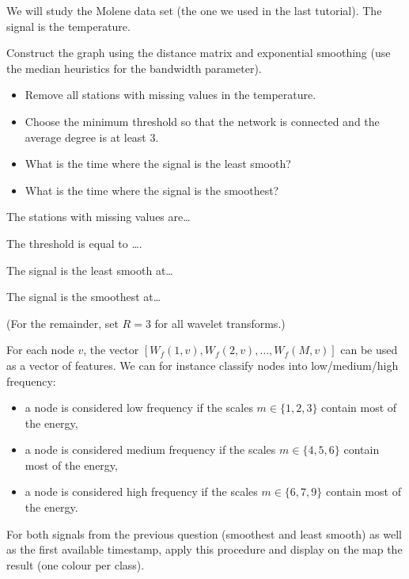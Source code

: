 \documentclass[11pt]{article}
\begin{document}
\newpage
We will study the Molene data set (the one we used in the last tutorial).
The signal is the temperature.

\begin{exercise}
Construct the graph using the distance matrix and exponential smoothing (use the median heuristics for the bandwidth parameter). 
\begin{itemize}
    \item Remove all stations with missing values in the temperature.
    \item Choose the minimum threshold so that the network is connected and the average degree is at least 3.
    \item What is the time where the signal is the least smooth?
    \item What is the time where the signal is the smoothest?
\end{itemize}
\end{exercise}

\begin{solution}
The stations with missing values are\dots

The threshold is equal to \dots.

The signal is the least smooth at\dots

The signal is the smoothest at\dots

\end{solution}

\newpage
\begin{exercise}
(For the remainder, set $R=3$ for all wavelet transforms.)

For each node $v$, the vector $[W_f(1, v), W_f(2, v),\dots, W_f(M, v)]$ can be used as a vector of features. We can for instance classify nodes into low/medium/high frequency: 
\begin{itemize}
    \item a node is considered low frequency if the scales $m\in\{1,2,3\}$ contain most of the energy,
    \item a node is considered medium frequency if the scales $m\in\{4,5,6\}$ contain most of the energy,
    \item a node is considered high frequency if the scales $m\in\{6,7,9\}$ contain most of the energy.
\end{itemize}


For both signals from the previous question (smoothest and least smooth) as well as the first available timestamp, apply this procedure and display on the map the result (one colour per class).

\end{exercise}
\end{document}

